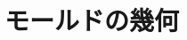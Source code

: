 


\usepackage{refcheck}


\setlength\baselineskip{18pt}
\setlength\normalbaselineskip{\baselineskip}

\tableofcontents








\part{モールドの幾何}



